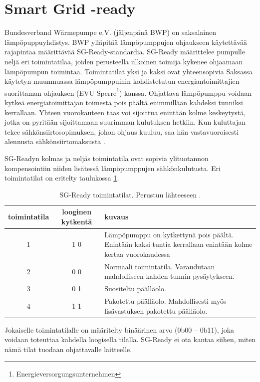 \section{Smart Grid -ready}

  Bundesverband Wärmepumpe e.V. (jäljenpänä BWP) on saksalainen lämpöpuppuyhdistys. BWP ylläpitää lämpöpumppujen ohjaukseen käytettävää rajapintaa määrittävää \gls{SG}-Ready-standardia.  \gls{SG}-Ready määrittelee pumpulle neljä eri toimintatilaa, joiden perusteella ulkoinen toimija kykenee ohjaamaan lämpöpumpun toimintaa. Toimintatilat yksi ja kaksi ovat yhteensopivia Saksassa käytetyn muunmuassa lämpöpumppuihin kohdistetutun energiantoimittajien suorittaman ohjauksen (EVU-Sperre\footnote{Energieversorgungsunternehmen}) kanssa. Ohjattava lämpöpumppu voidaan kytkeä energiatoimittajan toimesta pois päältä enimmillään kahdeksi tunniksi kerrallaan. Yhteen vuorokauteen taas voi sijoittua enintään kolme keskeytystä, jotka on pyritään sijoittamaan suurimman kulutuksen hetkiin. Kun kuluttajan tekee sähkönsiirtosopimuksen, johon ohjaus kuuluu, saa hän vastavuoroisesti alennusta sähkönsiirtomaksusta .\parencite{SGReadyReg}

  SG-Readyn  kolmas ja neljäs toimintatila ovat sopivia ylituotannon kompensointiin niiden lisätessä lämpöpumppujen sähkönkulutusta. Eri toimintatilat on eritelty taulukossa \ref{sgready}.
  \begin{table}[h]
    \centering
    \caption[\gls{SG}-Ready toimintatilat]{\gls{SG}-Ready toimintatilat. Perustuu lähteeseen \parencite{SGReadyReg}.}
    \begin{tabular}{|c|c|p{3in}|}
      \hline
      \rowcolor{lightgray} toimintatila & looginen kytkentä & kuvaus \\\hline
      1 & 1 0 & Lämpöpumppu on kytkettynä pois päältä. Enintään kaksi tuntia kerrallaan enintään kolme kertaa vuorokaudessa \\\hline
      2 & 0 0 & Normaali toimintatila. Varaudutaan mahdolliseen kahden tunnin pysäytykseen. \\\hline
      3 & 0 1 & Suositeltu päälläolo. \\ \hline
      4 & 1 1 & Pakotettu päälläolo. Mahdollisesti myös lisävastuksen pakotettu päälläolo. \\\hline
    \end{tabular}
    \label{sgready}
  \end{table}
  Jokaiselle toimintatilalle on määritelty binäärinen arvo (0b00 -- 0b11), joka voidaan toteuttaa kahdella loogisella tilalla. SG-Ready ei ota kantaa siihen, miten nämä tilat tuodaan ohjattavalle laitteelle.\parencite{SGReadyReg}

